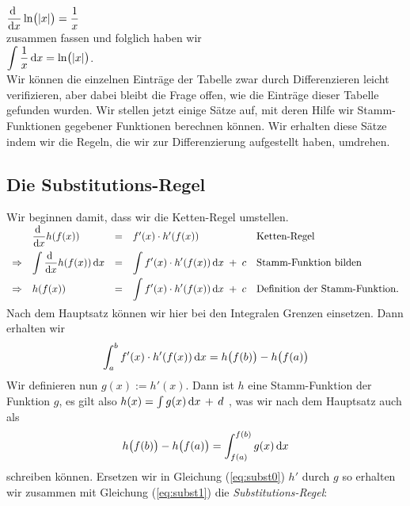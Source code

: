 \hspace*{1.3cm}
$\displaystyle\frac{\textrm{d}\;}{\textrm{d}x} \ln\bigl(|x|\bigr) = \frac{1}{x}$
\\[0.2cm]
zusammen fassen und folglich haben wir
\\[0.2cm]
\hspace*{1.3cm}
 $\displaystyle\int \frac{1}{x}\,\textrm{d} x = \ln\bigl(|x|\bigr)$.
\\[0.2cm]
Wir k\"onnen die einzelnen Eintr\"age der Tabelle zwar durch Differenzieren leicht
verifizieren, aber dabei bleibt die Frage offen, wie die Eintr\"age dieser Tabelle gefunden
wurden.  Wir stellen jetzt einige S\"atze auf, mit deren Hilfe wir Stamm-Funktionen
gegebener Funktionen berechnen k\"onnen.  Wir erhalten diese S\"atze indem wir die
Regeln, die wir zur Differenzierung aufgestellt haben, umdrehen.  


\subsection{Die Substitutions-Regel}
Wir beginnen damit, dass wir die Ketten-Regel umstellen.
\\[0.3cm]
\hspace*{1.3cm}
$
\begin{array}[t]{llcll}
            & \displaystyle\frac{\textrm{d}\;}{\textrm{d}x} h(f(x)) & = & f'(x) \cdot  h'(f(x)) & \mbox{Ketten-Regel} \\[0.3cm]
\Rightarrow & \displaystyle\int\displaystyle\frac{\textrm{d}\;}{\textrm{d}x} h(f(x))\, \textrm{d} x & = & \displaystyle\int f'(x) \cdot  h'(f(x))\, \textrm{d} x  \;+\; c & \mbox{Stamm-Funktion bilden} \\[0.3cm]
\Rightarrow & h(f(x))  & = & \displaystyle\int f'(x) \cdot  h'(f(x))\, \textrm{d} x \;+\; c   & \mbox{Definition der Stamm-Funktion}. \\[0.3cm]
\end{array}
$
\\[0.3cm]
Nach dem Hauptsatz k\"onnen wir hier bei den Integralen Grenzen einsetzen. Dann erhalten wir
\begin{equation}
  \label{eq:subst0}
  \int_a^b f'(x) \cdot  h'(f(x))\, \textrm{d} x  =  h\bigl(f(b)\bigr) - h\bigl(f(a)\bigr)
\end{equation} 
Wir definieren nun $g(x) := h'(x)$.  Dann ist $h$ eine Stamm-Funktion der Funktion $g$, es
gilt also $h(x) = \int g(x)\, \textrm{d} x \,+\, d$ , was wir nach dem Hauptsatz auch als
\begin{equation}
  \label{eq:subst1}
h\bigl(f(b)\bigr) - h\bigl(f(a)\bigr) = \int_{f(a)}^{f(b)} g(x)\,\textrm{d} x  
\end{equation}
schreiben k\"onnen.
Ersetzen wir in Gleichung (\ref{eq:subst0})  $h'$
durch $g$ so erhalten wir zusammen mit Gleichung (\ref{eq:subst1})  die \emph{Substitutions-Regel}:
